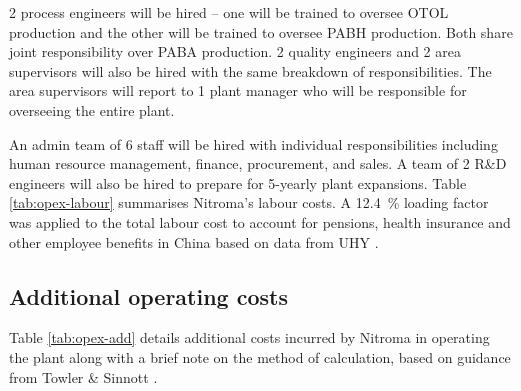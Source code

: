 2 process engineers will be hired – one will be trained to oversee OTOL production and the other will be trained to oversee PABH production. Both share joint responsibility over PABA production. 2 quality engineers and 2 area supervisors will also be hired with the same breakdown of responsibilities. The area supervisors will report to 1 plant manager who will be responsible for overseeing the entire plant. 

An admin team of 6 staff will be hired with individual responsibilities including human resource management, finance, procurement, and sales. A team of 2 R\&D engineers will also be hired to prepare for 5-yearly plant expansions.
Table \ref{tab:opex-labour} summarises Nitroma's labour costs. A \SI{12.4}{\percent} loading factor was applied to the total labour cost to account for pensions, health insurance and other employee benefits in China based on data from UHY \cite{uhy_employers_2021}.


\subsection{Additional operating costs}
Table \ref{tab:opex-add} details additional costs incurred by Nitroma in operating the plant along with a brief note on the method of calculation, based on guidance from Towler \& Sinnott \cite{sinnott_chemical_2020}.

